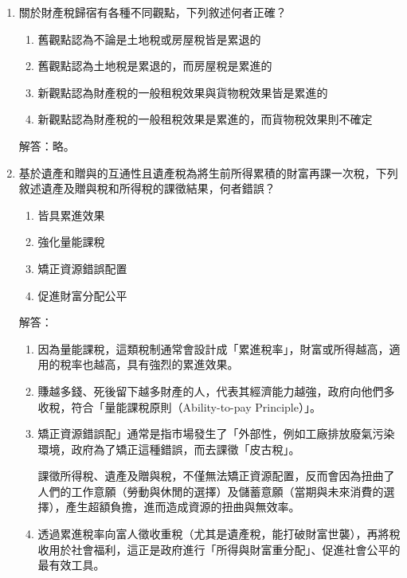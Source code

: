 \documentclass[12pt, a4paper]{article}
\begin{document}
\begin{enumerate}
    \item 關於財產稅歸宿有各種不同觀點，下列敘述何者正確？
    \begin{enumerate}[label=\Alph*.]
        \item 舊觀點認為不論是土地稅或房屋稅皆是累退的
        \item 舊觀點認為土地稅是累退的，而房屋稅是累進的
        \item 新觀點認為財產稅的一般租稅效果與貨物稅效果皆是累進的
        \item 新觀點認為財產稅的一般租稅效果是累進的，而貨物稅效果則不確定
    \end{enumerate}
    解答：略。

    \item 基於遺產和贈與的互通性且遺產稅為將生前所得累積的財富再課一次稅，下列敘述遺產及贈與稅和所得稅的課徵結果，何者錯誤？
    \begin{enumerate}[label=\Alph*.]
        \item 皆具累進效果
        \item 強化量能課稅
        \item 矯正資源錯誤配置
        \item 促進財富分配公平
    \end{enumerate}
    解答：
    \begin{enumerate}[label=\Alph*.]
        \item 因為量能課稅，這類稅制通常會設計成「累進稅率」，財富或所得越高，適用的稅率也越高，具有強烈的累進效果。
        \item  賺越多錢、死後留下越多財產的人，代表其經濟能力越強，政府向他們多收稅，符合「量能課稅原則（Ability-to-pay Principle）」。
        \item 矯正資源錯誤配」通常是指市場發生了「外部性，例如工廠排放廢氣污染環境，政府為了矯正這種錯誤，而去課徵「皮古稅」。

        課徵所得稅、遺產及贈與稅，不僅無法矯正資源配置，反而會因為扭曲了人們的工作意願（勞動與休閒的選擇）及儲蓄意願（當期與未來消費的選擇），產生超額負擔，進而造成資源的扭曲與無效率。
        \item 透過累進稅率向富人徵收重稅（尤其是遺產稅，能打破財富世襲），再將稅收用於社會福利，這正是政府進行「所得與財富重分配」、促進社會公平的最有效工具。
    \end{enumerate}


\end{enumerate}
\end{document}
